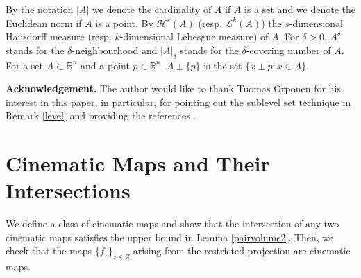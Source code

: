 \documentclass[11pt,a4paper,reqno]{amsart}
\newcommand{\R}{\mathbb{R}}
\newcommand{\1}{\mathbf{1}}
\numberwithin{equation}{section}
\theoremstyle{plain}
\theoremstyle{definition}
\theoremstyle{remark}
\begin{document}
By the notation $|A|$ we denote the cardinality of $A$ if $A$ is a set and we denote the Euclidean norm if $A$ is a point. By $\mathcal{H}^{s}(A)$ (resp. $\mathcal{L}^{k}(A)$) the $s$-dimensional Hausdorff measure (resp. $k$-dimensional Lebesgue measure) of $A$. For $\delta>0$, $A^\delta$ stands for the $\delta$-neighbourhood and $|A|_\delta$ stands for the $\delta$-covering number of $A$. For a set $A \subset \R^n$ and a point $p \in \R^n$, $A \pm \{p\}$ is the set $\{x \pm p: x \in A \}$.






\bigskip
\noindent
{\bf Acknowledgement.}
The author would like to thank Tuomas Orponen for his interest in this paper, in particular, for pointing out the sublevel set technique in Remark \ref{level} and providing the references  \cite{Jarvenpaa2008,FasslerOrponen14}.




\section{Cinematic Maps and Their Intersections} \label{s2}
We define a class of cinematic maps and show that the intersection of any two cinematic maps
satisfies the upper bound in Lemma \ref{pairvolume2}. Then, we check that the maps $\{f_z\}_{z \in Z}$ arising from the restricted projection are cinematic maps.
\end{document}
